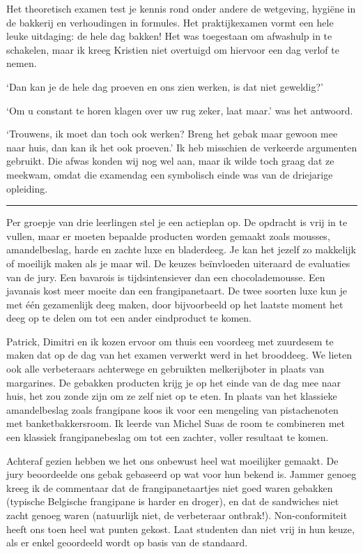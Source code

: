 \documentclass[
  11pt,
  dutch,
]{memoir}
\begin{document}
Het theoretisch examen test je kennis rond onder andere de wetgeving,
hygiëne in de bakkerij en verhoudingen in formules. Het praktijkexamen
vormt een hele leuke uitdaging: de hele dag bakken! Het was toegestaan
om afwashulp in te schakelen, maar ik kreeg Kristien niet overtuigd om
hiervoor een dag verlof te nemen.

`Dan kan je de hele dag proeven en ons zien werken, is dat niet
geweldig?'

`Om u constant te horen klagen over uw rug zeker, laat maar.' was het
antwoord.

`Trouwens, ik moet dan toch ook werken? Breng het gebak maar gewoon mee
naar huis, dan kan ik het ook proeven.' Ik heb misschien de verkeerde
argumenten gebruikt. Die afwas konden wij nog wel aan, maar ik wilde
toch graag dat ze meekwam, omdat die examendag een symbolisch einde was
van de driejarige opleiding.

\pfbreak

Per groepje van drie leerlingen stel je een actieplan op. De opdracht is
vrij in te vullen, maar er moeten bepaalde producten worden gemaakt
zoals mousses, amandelbeslag, harde en zachte luxe en bladerdeeg. Je kan
het jezelf zo makkelijk of moeilijk maken als je maar wil. De keuzes
beïnvloeden uiteraard de evaluaties van de jury. Een bavarois is
tijdsintensiever dan een chocolademousse. Een javanais kost meer moeite
dan een frangipanetaart. De twee soorten luxe kun je met één gezamenlijk
deeg maken, door bijvoorbeeld op het laatste moment het deeg op te delen
om tot een ander eindproduct te komen.

Patrick, Dimitri en ik kozen ervoor om thuis een voordeeg met zuurdesem
te maken dat op de dag van het examen verwerkt werd in het brooddeeg. We
lieten ook alle verbeteraars achterwege en gebruikten melkerijboter in
plaats van margarines. De gebakken producten krijg je op het einde van
de dag mee naar huis, het zou zonde zijn om ze zelf niet op te eten. In
plaats van het klassieke amandelbeslag zoals frangipane koos ik voor een
mengeling van pistachenoten met banketbakkersroom. Ik leerde van Michel
Suas de room te combineren met een klassiek frangipanebeslag om tot een
zachter, voller resultaat te komen.

Achteraf gezien hebben we het ons onbewust heel wat moeilijker gemaakt.
De jury beoordeelde ons gebak gebaseerd op wat voor hun bekend is.
Jammer genoeg kreeg ik de commentaar dat de frangipanetaartjes niet goed
waren gebakken (typische Belgische frangipane is harder en droger), en
dat de sandwiches niet zacht genoeg waren (natuurlijk niet, de
verbeteraar ontbrak!). Non-conformiteit heeft ons toen heel wat punten
gekost. Laat studenten dan niet vrij in hun keuze, als er enkel
geoordeeld wordt op basis van de standaard.
\end{document}
